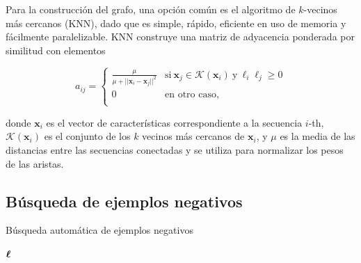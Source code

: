 Para la construcción del grafo, una opción común es el algoritmo de $k$-vecinos más cercanos (KNN), dado que es simple, rápido, eficiente en uso de
memoria y fácilmente paralelizable. KNN construye una matriz de adyacencia ponderada por similitud con elementos

\begin{equation}
	a_{ij} =
	\begin{cases}
		\frac{\mu}{\mu + ||\mathbf{x}_{i} - \mathbf{x}_{j}||^2} & \text{si} \ \mathbf{x}_{j} \in  \mathcal{K}(\mathbf{x}_{i}) \ \text{y} \ \ell_{i}
		\ell_{j} \geq 0 \\
		0 & \text{en otro caso,} \\
	\end{cases}
\end{equation}

\noindent donde $\mathbf{x}_{i}$ es el vector de características correspondiente a la secuencia $i$-th, $\mathcal{K} (\mathbf{x}_{i})$ es el conjunto de los
$k$ vecinos más cercanos de $\mathbf{x}_{i}$, y $\mu$ es la media de las distancias entre las secuencias conectadas y se  utiliza para normalizar los pesos de
las aristas.

\subsection{Búsqueda de ejemplos negativos}

\renewcommand{\algorithmicrequire}{\textbf{Entrada:}}
\renewcommand{\algorithmicensure}{\textbf{Salida:}}
\renewcommand{\algorithmicrepeat}{\textbf{repetir}}
\renewcommand{\algorithmicuntil}{\textbf{mientras}}
\renewcommand{\algorithmicreturn}{\textbf{delvolver}}
\begin{algorithm}[tpb]
	\caption{Búsqueda automática de ejemplos negativos}
	\label{algNS}
	\begin{algorithmic}[1]
		\REPEAT
		\RETURN $\boldsymbol\ell$
	\end{algorithmic}
\end{algorithm}

